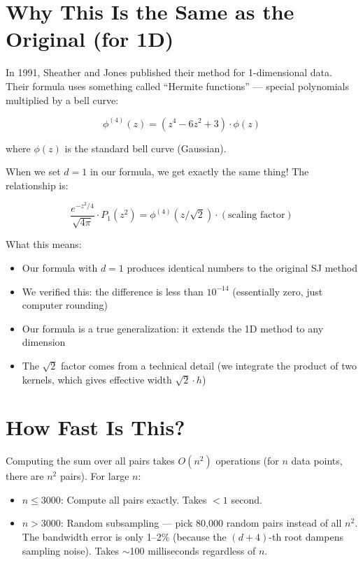 \documentclass[12pt]{article}
\newcommand{\step}[1]{\begin{tcolorbox}[colback=blue!5,colframe=blue!50!black,title=Step-by-Step]\small #1\end{tcolorbox}}
\begin{document}
\section{Why This Is the Same as the Original (for 1D)}

In 1991, Sheather and Jones published their method for 1-dimensional data. Their formula uses something called ``Hermite functions'' --- special polynomials multiplied by a bell curve:

$$\phi^{(4)}(z) = (z^4 - 6z^2 + 3) \cdot \phi(z)$$

where $\phi(z)$ is the standard bell curve (Gaussian).

When we set $d=1$ in our formula, we get exactly the same thing! The relationship is:

$$\frac{e^{-z^2/4}}{\sqrt{4\pi}} \cdot P_1(z^2) = \phi^{(4)}(z/\sqrt{2}) \cdot (\text{scaling factor})$$

\step{
What this means:
\begin{itemize}
\item Our formula with $d=1$ produces identical numbers to the original SJ method
\item We verified this: the difference is less than $10^{-14}$ (essentially zero, just computer rounding)
\item Our formula is a true generalization: it extends the 1D method to any dimension
\item The $\sqrt{2}$ factor comes from a technical detail (we integrate the product of two kernels, which gives effective width $\sqrt{2} \cdot h$)
\end{itemize}
}

\section{How Fast Is This?}

Computing the sum over all pairs takes $O(n^2)$ operations (for $n$ data points, there are $n^2$ pairs). For large $n$:

\begin{itemize}
\item \textbf{$n \leq 3000$}: Compute all pairs exactly. Takes $< 1$ second.
\item \textbf{$n > 3000$}: Random subsampling --- pick 80,000 random pairs instead of all $n^2$. The bandwidth error is only 1--2\% (because the $(d+4)$-th root dampens sampling noise). Takes $\sim$100 milliseconds regardless of $n$.
\end{itemize}
\end{document}
